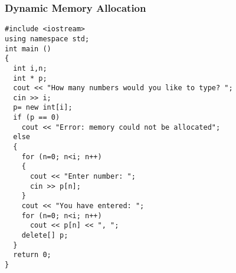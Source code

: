 \documentclass{beamer}
\newtheorem{Key points}{Key points}
\newcommand\Fontvia{\fontsize{6}{7.2}\selectfont}
\begin{document}
\begin{frame}[fragile]
\frametitle{Dynamic Memory Allocation}
\Fontvia
\begin{lstlisting}
#include <iostream>
using namespace std;
int main ()
{
  int i,n;
  int * p;
  cout << "How many numbers would you like to type? ";
  cin >> i;
  p= new int[i];
  if (p == 0)
    cout << "Error: memory could not be allocated";
  else
  {
    for (n=0; n<i; n++)
    {
      cout << "Enter number: ";
      cin >> p[n];
    }
    cout << "You have entered: ";
    for (n=0; n<i; n++)
      cout << p[n] << ", ";
    delete[] p;
  }
  return 0;
}
\end{lstlisting}
\end{frame}
\end{document}
